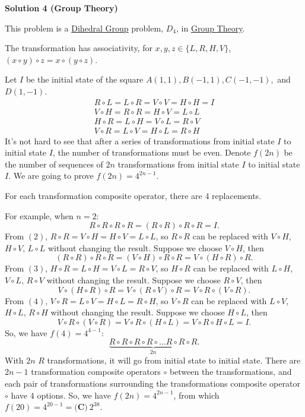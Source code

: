 \begin{enumerate}
\textbf{Solution 4 (Group Theory)}

This problem is a \href{https://en.wikipedia.org/wiki/Dihedral\_group}{Dihedral Group} problem, $D_4$, in \href{https://en.wikipedia.org/wiki/Group\_theory}{Group Theory}.

 The transformation has associativity, for $x, y, z \in 	\{ L, R, H, V \}$, $(x \circ y) \circ z = x \circ (y \circ z)$.

 Let $I$ be the initial state of the square $A(1,1), B(-1,1), C(-1,-1),$ and $D(1,-1)$.
 \begin{align} R \circ L = L \circ R = V \circ V = H \circ H = I\\ V \circ H = R \circ R = H \circ V = L \circ L\\ H \circ R = L \circ H = V \circ L = R \circ V\\ V \circ R = L \circ V = H \circ L = R \circ H \end{align}It's not hard to see that after a series of transformations from initial state $I$ to initial state $I$, the number of transformations must be even. Denote $f(2n)$ be the number of sequences of $2n$ transformations from initial state $I$ to initial state $I$. We are going to prove $f(2n) = 4^{2n-1}$.

 For each transformation composite operator, there are $4$ replacements. 

 For example, when $n = 2$:
 \[R \circ R \circ R \circ R = (R \circ R) \circ R \circ R = I.\]From $(2)$, $R \circ R = V \circ H = H \circ V = L \circ L$, so $R \circ R$ can be replaced with $V \circ H$, $H \circ V$, $L \circ L$ without changing the result. Suppose we choose $V \circ H$, then 
 \[(R \circ R) \circ R \circ R = (V \circ H) \circ R \circ R = V \circ (H \circ R) \circ R.\]From $(3)$, $H \circ R = L \circ H = V \circ L = R \circ V$, so $H \circ R$ can be replaced with $L \circ H$, $V \circ L$, $R \circ V$ without changing the result. Suppose we choose $R \circ V$, then 
 \[V \circ (H \circ R) \circ R = V \circ (R \circ V) \circ R = V \circ R \circ (V \circ R).\]From $(4)$, $V \circ R = L \circ V = H \circ L = R \circ H$, so $V \circ R$ can be replaced with $L \circ V$, $H \circ L$, $R \circ H$ without changing the result. Suppose we choose $H \circ L$, then 
 \[V \circ R \circ (V \circ R) =V \circ R \circ (H \circ L) = V \circ R \circ H \circ L = I.\]So, we have $f(4) = 4^{4-1}$:
 \[\underbrace{R \circ R \circ R \circ R \circ \dots R \circ R \circ R}_{2n}.\]With $2n$ $R$ transformations, it will go from initial state to initial state. There are $2n-1$ transformation composite operators $\circ$ between the transformations, and each pair of transformations surrounding the transformations composite operator $\circ$ have $4$ options. So, we have $f(2n) = 4^{2n-1}$, from which $f(20) = 4^{20-1} = \boxed{\textbf{(C)}\ 2^{38}}$.


\end{enumerate}

